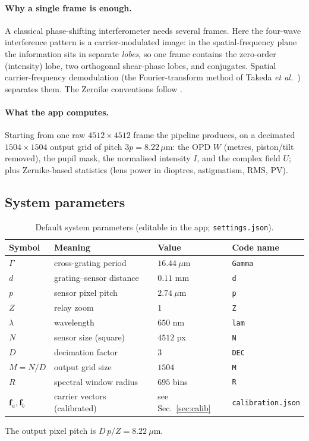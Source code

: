 \documentclass[11pt,a4paper]{article}
\theoremstyle{definition}
\newcommand{\vf}{\bm{f}}
\newcommand{\code}[1]{\texttt{\small #1}}
\begin{document}
\paragraph{Why a single frame is enough.}
A classical phase-shifting interferometer needs several frames. Here the four-wave interference pattern is a carrier-modulated image:
in the spatial-frequency plane the information sits in separate \emph{lobes}, so one frame contains the zero-order (intensity) lobe, two
orthogonal shear-phase lobes, and conjugates. Spatial carrier-frequency demodulation
(the Fourier-transform method of Takeda \emph{et al.}~\cite{Takeda1982}) separates them. The Zernike conventions follow \cite{Noll1976,ANSI}.

\paragraph{What the app computes.}
Starting from one raw $4512\times4512$ frame the pipeline produces, on a decimated $1504\times1504$ output grid of pitch $3p=8.22\,\mu\mathrm{m}$:
the OPD $W$ (metres, piston/tilt removed), the pupil mask, the normalised intensity $I$, and the complex field $U$; plus Zernike-based statistics
(lens power in dioptres, astigmatism, RMS, PV).

\subsection{System parameters}
\begin{table}[h]
\centering
\caption{Default system parameters (editable in the app; \code{settings.json}).}
\begin{tabular}{llll}
\toprule
Symbol & Meaning & Value & Code name \\
\midrule
$\Gamma$ & cross-grating period & $16.44\ \mu$m & \code{Gamma} \\
$d$ & grating--sensor distance & $0.11$ mm & \code{d} \\
$p$ & sensor pixel pitch & $2.74\ \mu$m & \code{p} \\
$Z$ & relay zoom & $1$ & \code{Z} \\
$\lambda$ & wavelength & $650$ nm & \code{lam} \\
$N$ & sensor size (square) & $4512$ px & \code{N} \\
$D$ & decimation factor & $3$ & \code{DEC} \\
$M=N/D$ & output grid size & $1504$ & \code{M} \\
$R$ & spectral window radius & $695$ bins & \code{R} \\
$\vf_a,\vf_b$ & carrier vectors (calibrated) & see Sec.~\ref{sec:calib} & \code{calibration.json} \\
\bottomrule
\end{tabular}
\end{table}
The output pixel pitch is $D\,p/Z = 8.22\ \mu$m.
\end{document}
